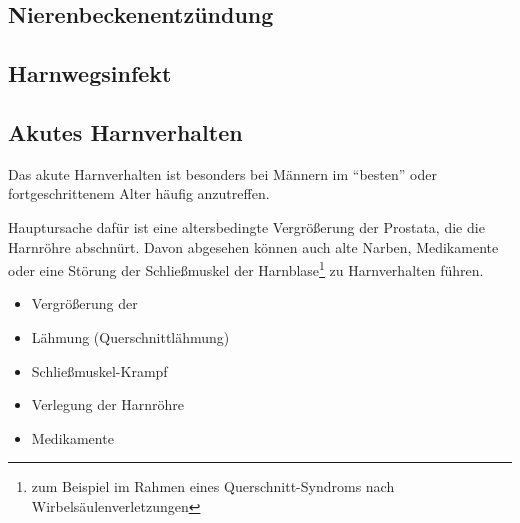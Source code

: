 {\SymbolText}{}{}{}




\subsection{Nierenbeckenentzündung}
\label{topic:nierenbeckenentzuendung}

{\TakeNotesLarge}

\subsection{Harnwegsinfekt}
\label{topic:harnwegsinfekt}

{\TakeNotesLarge}

\subsection{Akutes Harnverhalten}




Das akute Harnverhalten ist besonders bei Männern im "`besten"'
oder fortgeschrittenem Alter häufig anzutreffen. 

{
Hauptursache  dafür ist eine
altersbedingte Vergrößerung der Prostata, die die Harnröhre abschnürt. Davon abgesehen
können auch alte Narben, Medikamente oder eine Störung der
Schließmuskel der Harnblase\footnote{zum Beispiel im Rahmen eines
Querschnitt-Syndroms nach Wirbelsäulenverletzungen} zu
Harnverhalten führen. 
}
{
\begin{itemize}
     \item Vergrößerung der 
    \item Lähmung (Querschnittlähmung)
    \item Schließmuskel-Krampf
    \item Verlegung der Harnröhre
    \item Medikamente
\end{itemize}
}{}{}{}

